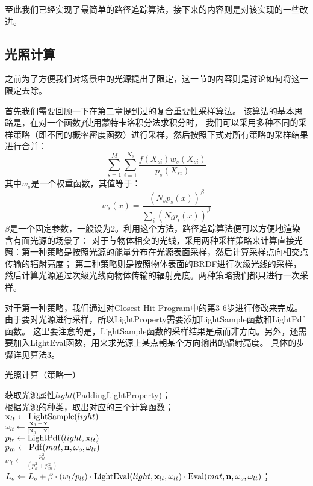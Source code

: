 至此我们已经实现了最简单的路径追踪算法，接下来的内容则是对该实现的一些改进。

\subsection{光照计算}

之前为了方便我们对场景中的光源提出了限定，这一节的内容则是讨论如何将这一限定去除。

首先我们需要回顾一下在第二章提到过的复合重要性采样算法。
该算法的基本思路是，在对一个函数$f$使用蒙特卡洛积分法求积分时，
我们可以采用多种不同的采样策略（即不同的概率密度函数）进行采样，然后按照下式对所有策略的采样结果进行合并：
\begin{equation}
    \sum_{s=1}^{M} \sum_{i=1}^{N_s}\frac{f(X_{si})w_s(X_{si})}{p_s(X_{si})}
\end{equation}
其中$w_s$是一个权重函数，其值等于：
\begin{equation}
    w_s(x) = \frac{(N_sp_s(x))^\beta}{\sum_i(N_ip_i(x))^\beta}
\end{equation}
$\beta$是一个固定参数，一般设为2。利用这个方法，路径追踪算法便可以方便地渲染含有面光源的场景了：
对于与物体相交的光线，采用两种采样策略来计算直接光照：第一种策略是按照光源的能量分布在光源表面采样，然后计算采样点向相交点传输的辐射亮度；
第二种策略则是按照物体表面的BRDF进行次级光线的采样，然后计算光源通过次级光线向物体传输的辐射亮度。两种策略我们都只进行一次采样。

对于第一种策略，我们通过对Closest Hit Program中的第3-6步进行修改来完成。
由于要对光源进行采样，所以LightProperty需要添加LightSample函数和LightPdf函数。
这里要注意的是，LightSample函数的采样结果是点而非方向。另外，还需要加入LightEval函数，用来求光源上某点朝某个方向输出的辐射亮度。
具体的步骤详见算法3。

\begin{algorithm}
    \caption{光照计算（策略一）}

    获取光源属性$light$(PaddingLightProperty)；\\
    根据光源的种类，取出对应的三个计算函数；\\
    $\textbf{x}_{lt} \leftarrow {\rm LightSample}(light)$\\
    $\omega_{lt} \leftarrow \frac{\textbf{x}_{lt}-\textbf{x}}{|\textbf{x}_{lt}-\textbf{x}|}$\\
    $p_{lt} \leftarrow {\rm LightPdf}(light, \textbf{x}_{lt})$\\
    $p_m \leftarrow {\rm Pdf}(mat, \textbf{n}, \omega_o, \omega_{lt})$\\
    $w_l \leftarrow \frac{p_{lt}^2}{(p_{lt}^2+p_m^2)}$\\
    {$L_o \leftarrow L_o+\beta\cdot(w_l/p_{lt})\cdot {\rm LightEval}(light, \textbf{x}_{lt}, \omega_{lt})\cdot {\rm Eval}(mat, \textbf{n}, \omega_o, \omega_{lt}) $；} 
\end{algorithm}

